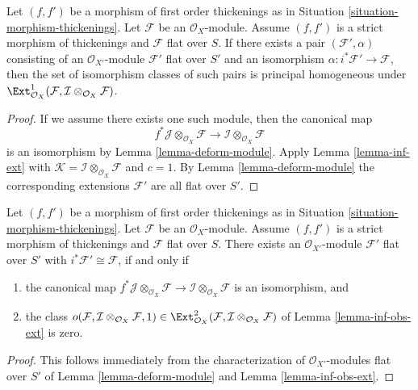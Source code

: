\begin{lemma}
\label{lemma-inf-ext-rel}
Let $(f, f')$ be a morphism of first order thickenings as in
Situation \ref{situation-morphism-thickenings}.
Let $\mathcal{F}$ be an $\mathcal{O}_X$-module.
Assume $(f, f')$ is a strict morphism of thickenings and
$\mathcal{F}$ flat over $S$. If there exists a pair
$(\mathcal{F}', \alpha)$ consisting of an
$\mathcal{O}_{X'}$-module $\mathcal{F}'$ flat over $S'$ and an isomorphism
$\alpha : i^*\mathcal{F}' \to \mathcal{F}$, then the set of
isomorphism classes of such pairs is principal homogeneous
under
$\Ext^1_{\mathcal{O}_X}(
\mathcal{F}, \mathcal{I} \otimes_{\mathcal{O}_X} \mathcal{F})$.
\end{lemma}

\begin{proof}
If we assume there exists one such module, then the canonical map
$$
f^*\mathcal{J} \otimes_{\mathcal{O}_X} \mathcal{F} \to
\mathcal{I} \otimes_{\mathcal{O}_X} \mathcal{F}
$$
is an isomorphism by Lemma \ref{lemma-deform-module}. Apply
Lemma \ref{lemma-inf-ext} with $\mathcal{K} = 
\mathcal{I} \otimes_{\mathcal{O}_X} \mathcal{F}$
and $c = 1$. By Lemma \ref{lemma-deform-module} the corresponding extensions
$\mathcal{F}'$ are all flat over $S'$.
\end{proof}

\begin{lemma}
\label{lemma-inf-obs-ext-rel}
Let $(f, f')$ be a morphism of first order thickenings as in
Situation \ref{situation-morphism-thickenings}.
Let $\mathcal{F}$ be an $\mathcal{O}_X$-module. Assume
$(f, f')$ is a strict morphism of thickenings
and $\mathcal{F}$ flat over $S$. There exists an
$\mathcal{O}_{X'}$-module $\mathcal{F}'$ flat over $S'$ with
$i^*\mathcal{F}' \cong \mathcal{F}$, if and only if
\begin{enumerate}
\item the canonical map $
f^*\mathcal{J} \otimes_{\mathcal{O}_X} \mathcal{F} \to
\mathcal{I} \otimes_{\mathcal{O}_X} \mathcal{F}$
is an isomorphism, and
\item the class
$o(\mathcal{F}, \mathcal{I} \otimes_{\mathcal{O}_X} \mathcal{F}, 1)
\in \Ext^2_{\mathcal{O}_X}(
\mathcal{F}, \mathcal{I} \otimes_{\mathcal{O}_X} \mathcal{F})$
of Lemma \ref{lemma-inf-obs-ext} is zero.
\end{enumerate}
\end{lemma}

\begin{proof}
This follows immediately from the characterization of
$\mathcal{O}_{X'}$-modules flat over $S'$ of 
Lemma \ref{lemma-deform-module} and
Lemma \ref{lemma-inf-obs-ext}.
\end{proof}






